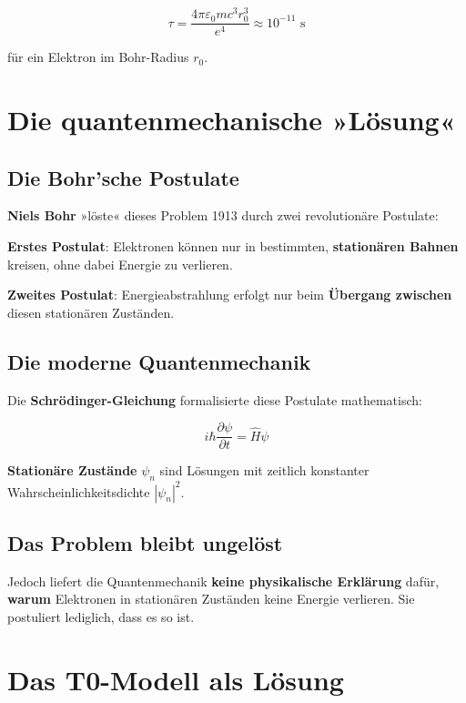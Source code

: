 \documentclass[12pt,a4paper]{report}
\begin{document}
\begin{equation}
	\tau = \frac{4\pi\varepsilon_0 m c^3 r_0^3}{e^4} \approx 10^{-11} \text{ s}
\end{equation}

für ein Elektron im Bohr-Radius $r_0$.

\section{Die quantenmechanische »Lösung«}

\subsection{Die Bohr'sche Postulate}

\textbf{Niels Bohr} »löste« dieses Problem 1913 durch zwei revolutionäre Postulate:

\textbf{Erstes Postulat}: Elektronen können nur in bestimmten, \textbf{stationären Bahnen} kreisen, ohne dabei Energie zu verlieren.

\textbf{Zweites Postulat}: Energieabstrahlung erfolgt nur beim \textbf{Übergang zwischen} diesen stationären Zuständen.

\subsection{Die moderne Quantenmechanik}

Die \textbf{Schrödinger-Gleichung} formalisierte diese Postulate mathematisch:

\begin{equation}
	i\hbar\frac{\partial\psi}{\partial t} = \hat{H}\psi
\end{equation}

\textbf{Stationäre Zustände} $\psi_n$ sind Lösungen mit zeitlich konstanter Wahrscheinlichkeitsdichte $|\psi_n|^2$.

\subsection{Das Problem bleibt ungelöst}

Jedoch liefert die Quantenmechanik \textbf{keine physikalische Erklärung} dafür, \textbf{warum} Elektronen in stationären Zuständen keine Energie verlieren. Sie postuliert lediglich, dass es so ist.

\section{Das T0-Modell als Lösung}
\end{document}
